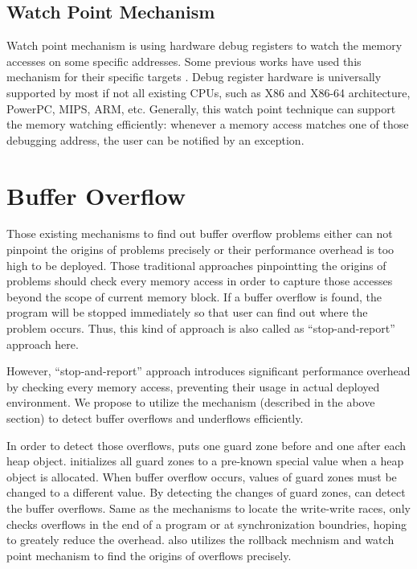 \subsection{Watch Point Mechanism}
\label{sec:watchpoint}

Watch point mechanism is using hardware debug registers to watch the memory accesses on
some specific addresses. Some previous works have used this mechanism 
for their specific targets \cite{fastboundschecking}. 
Debug register hardware is universally supported by most if not all existing CPUs, such as
X86 and X86-64 architecture, PowerPC, MIPS, ARM, etc. 
Generally, this watch point technique can support the memory watching efficiently: whenever
a memory access matches one of those debugging address, the user can be notified by an exception.

\section{Buffer Overflow}
Those existing mechanisms to find out buffer overflow problems either can not pinpoint the origins of
problems precisely or their performance overhead is too high to be deployed. 
Those traditional approaches pinpointting the origins of problems should 
check every memory access in order to capture those accesses beyond the scope of 
current memory block. 
If a buffer overflow is found, the program will be stopped immediately 
so that user can find out where the problem occurs.
Thus, this kind of approach is also called as ``stop-and-report'' approach here. 

However, ``stop-and-report'' approach introduces significant performance overhead by 
checking every memory access,  
preventing their usage in actual deployed environment. 
We propose to utilize the \DoubleTake{} mechanism (described in the above section) 
to detect buffer overflows and underflows efficiently. 

In order to detect those overflows, \DoubleTake{} puts one guard zone before and 
one after each heap object. \DoubleTake{} initializes all guard zones to a pre-known special 
value when a heap object is allocated.
When buffer overflow occurs, values of guard zones must be changed to a different value.
By detecting the changes of guard zones, \DoubleTake{} can detect the buffer overflows. 
Same as the mechanisms to locate the write-write races, \DoubleTake{} only checks overflows 
in the end of a program or at synchronization boundries, hoping to greately reduce
the overhead.  
\DoubleTake{} also utilizes the rollback mechnism and watch point mechanism to find
the origins of overflows precisely.

